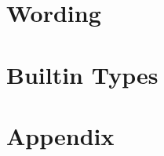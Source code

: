 \documentclass[11pt]{article}
\begin{document}
    \tableofcontents \newpage


    \section{Wording} \label{sec:wording}
    
    \newpage


    \section{Builtin Types} \label{sec:builtin_types}
    
    \newpage


    \section{Appendix} \label{sec:appendix}
    
\end{document}
